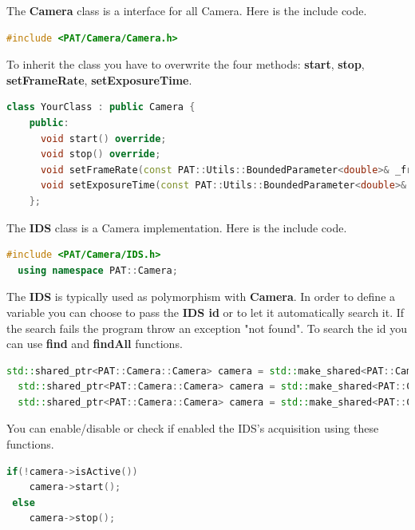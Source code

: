 
The \textbf{Camera} class is a interface for all Camera. Here is the
include code.

\begin{lstlisting}[language=c++, gobble=2]
  #include <PAT/Camera/Camera.h>
\end{lstlisting}

To inherit the class you have to overwrite the four methods:
\textbf{start}, \textbf{stop}, \textbf{setFrameRate},
\textbf{setExposureTime}.

\begin{lstlisting}[language=c++, gobble=2]
  class YourClass : public Camera {
    public:
      void start() override;
      void stop() override;
      void setFrameRate(const PAT::Utils::BoundedParameter<double>& _frameRate) override;
      void setExposureTime(const PAT::Utils::BoundedParameter<double>& _exposureTimeValue) override;
    };
\end{lstlisting}


The \textbf{IDS} class is a Camera implementation. Here is the include
code.

\begin{lstlisting}[language=c++, gobble=2]
  #include <PAT/Camera/IDS.h>
  using namespace PAT::Camera;
\end{lstlisting}

The \textbf{IDS} is typically used as polymorphism with \textbf{Camera}.
In order to define a variable you can choose to pass the \textbf{IDS id}
or to let it automatically search it. If the search fails the program
throw an exception "not found". To search the id you can use
\textbf{find} and \textbf{findAll} functions.

\begin{lstlisting}[language=c++, gobble=2]
  std::shared_ptr<PAT::Camera::Camera> camera = std::make_shared<PAT::Camera::IDS>();
  std::shared_ptr<PAT::Camera::Camera> camera = std::make_shared<PAT::Camera::IDS>(IDS::find());
  std::shared_ptr<PAT::Camera::Camera> camera = std::make_shared<PAT::Camera::IDS>(IDS::findAll()->uci[0].dwCameraID);
\end{lstlisting}

You can enable/disable or check if enabled the IDS's acquisition using
these functions.

\begin{lstlisting}[language=c++, gobble=2]
  if(!camera->isActive())
    camera->start();
 else
    camera->stop();
\end{lstlisting}

